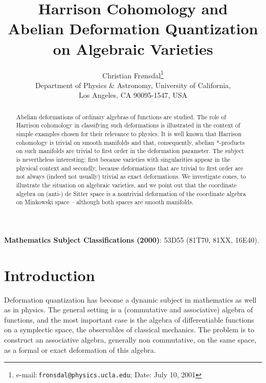 \documentclass[a4paper,a4paper]{article}
\begin{document}
\title{Harrison Cohomology and \\Abelian Deformation Quantization\\
on Algebraic Varieties}

\author{Christian Fr\o nsdal\thanks{e-mail:\,\texttt{fronsdal@physics.ucla.edu};
\quad Date: July 10, 2001} \\
{Department of Physics \& Astronomy, University of California,}\\
{Los Angeles, CA 90095-1547, USA }}
\date{}
\maketitle

\begin{abstract}
 Abelian deformations of ordinary algebras of
functions are studied. The role of Harrison cohomology in classifying such
deformations is illustrated in the context of simple examples chosen for
their relevance to physics.  It is well known that Harrison cohomology is
trivial on smooth manifolds and that, consequently,  abelian
$*$-products on such manifolds are trivial to first order in the
deformation parameter. The subject is nevertheless interesting;  first
because varieties with singularities appear in the physical context and
secondly, because deformations that are trivial to first order are not
always (indeed not usually) trivial as exact deformations. We investigate
cones, to illustrate the situation on algebraic varieties, and we point
out that the coordinate algebra on  (anti-) de Sitter space is a nontrivial
deformation of the coordinate algebra on Minkowski space  -- although
both spaces are smooth manifolds. 
\end{abstract}

\noindent\textbf{Mathematics Subject Classifications (2000)}: 
53D55 (81T70, 81XX, 16E40).


\section{Introduction}  %
Deformation quantization has become a dynamic subject in mathematics
as well as in physics. The general setting is a (commutative and
associative) algebra of functions, and the most important case is the
algebra of differentiable functions on a symplectic space, the observables
of classical mechanics. The problem is to construct an associative algebra,
generally non commutative, on the same space, as a formal or exact
deformation of this algebra. 
\end{document}
